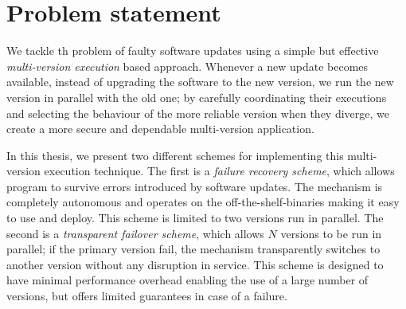 \section{Problem statement}
\label{overview:problem}

We tackle th problem of faulty software updates using a simple but effective
\emph{multi-version execution} based approach. Whenever a new update becomes
available, instead of upgrading the software to the new version, we run the new
version in parallel with the old one; by carefully coordinating their
executions and selecting the behaviour of the more reliable version when they
diverge, we create a more secure and dependable multi-version application.

In this thesis, we present two different schemes for implementing this
multi-version execution technique. The first is a \emph{failure recovery scheme},
which allows program to survive errors introduced by software updates. The
mechanism is completely autonomous and operates on the off-the-shelf-binaries
making it easy to use and deploy. This scheme is limited to two versions run in
parallel. The second is a \emph{transparent failover scheme}, which allows $N$
versions to be run in parallel; if the primary version fail, the mechanism
transparently switches to another version without any disruption in service.
This scheme is designed to have minimal performance overhead enabling the use
of a large number of versions, but offers limited guarantees in case of a
failure.


